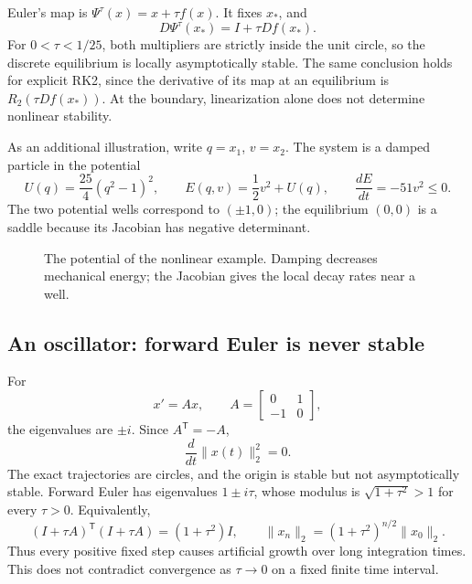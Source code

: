 Euler's map is \(\Psi^\tau(x)=x+\tau f(x)\). It fixes \(x_*\), and
\[
 D\Psi^\tau(x_*)=I+\tau Df(x_*).
\]
For \(0<\tau<1/25\), both multipliers are strictly inside the unit
circle, so the discrete equilibrium is locally asymptotically stable.
The same conclusion holds for explicit RK2, since the derivative of
its map at an equilibrium is \(R_2(\tau Df(x_*))\). At the boundary,
linearization alone does not determine nonlinear stability.

As an additional illustration, write \(q=x_1\), \(v=x_2\). The system
is a damped particle in the potential
\[
 U(q)=\frac{25}{4}(q^2-1)^2,
 \qquad E(q,v)=\frac12v^2+U(q),
 \qquad \frac{dE}{dt}=-51v^2\leq0.
\]
The two potential wells correspond to \((\pm1,0)\); the equilibrium
\((0,0)\) is a saddle because its Jacobian has negative determinant.

\begin{figure}[htbp]
\centering
{}
\caption{The potential of the nonlinear example. Damping decreases
mechanical energy; the Jacobian gives the local decay rates near a well.}
\end{figure}

\subsection{An oscillator: forward Euler is never stable}

For
\begin{equation}\label{eq:oscillator-sep-16}
 x'=Ax,\qquad A=\begin{bmatrix}0&1\\-1&0\end{bmatrix},
\end{equation}
the eigenvalues are \(\pm i\). Since \(A^{\mathsf T}=-A\),
\[
 \frac{d}{dt}\|x(t)\|_2^2=0.
\]
The exact trajectories are circles, and the origin is stable but not
asymptotically stable. Forward Euler has eigenvalues \(1\pm i\tau\),
whose modulus is \(\sqrt{1+\tau^2}>1\) for every \(\tau>0\).
Equivalently,
\[
 (I+\tau A)^{\mathsf T}(I+\tau A)=(1+\tau^2)I,
 \qquad
 \|x_n\|_2=(1+\tau^2)^{n/2}\|x_0\|_2.
\]
Thus every positive fixed step causes artificial growth over long
integration times. This does not contradict convergence as
\(\tau\to0\) on a fixed finite time interval.

